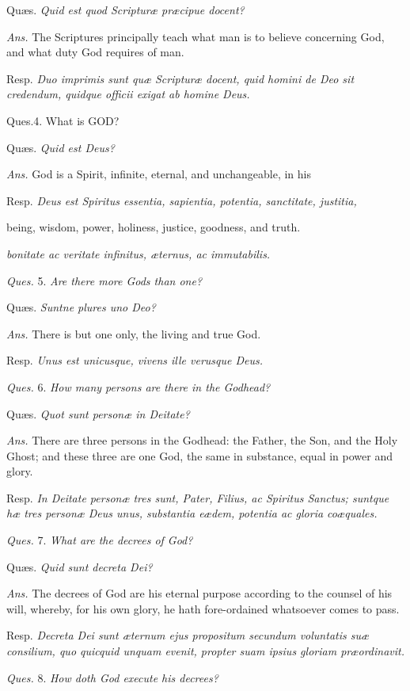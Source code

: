Quæs. \emph{Quid est quod Scripturæ præcipue docent?}

\emph{Ans.} The Scriptures principally teach what man is to believe concerning God, and what duty God requires of man.

Resp. \emph{Duo imprimis sunt quæ Scripturæ docent, quid homini de Deo sit credendum, quidque officii exigat ab homine Deus.}

Ques.4. What is GOD?

Quæs. \emph{Quid est Deus?}

\emph{Ans.} God is a Spirit, infinite, eternal, and unchangeable, in his

Resp. \emph{Deus est Spiritus essentia, sapientia, potentia, sanctitate, justitia,}

being, wisdom, power, holiness, justice, goodness, and truth.

\emph{bonitate ac veritate infinitus, æternus, ac immutabilis.}

\emph{Ques.} 5. \emph{Are there more Gods than one?}

Quæs. \emph{Suntne plures uno Deo?}

\emph{Ans.} There is but one only, the living and true God.

Resp. \emph{Unus est unicusque, vivens ille verusque Deus.}

\emph{Ques.} 6. \emph{How many persons are there in the Godhead?}

Quæs. \emph{Quot sunt personæ in Deitate?}

\emph{Ans.} There are three persons in the Godhead: the Father, the Son, and the Holy Ghost; and these three are one God, the same in substance, equal in power and glory.

Resp. \emph{In Deitate personæ tres sunt, Pater, Filius, ac Spiritus Sanctus; suntque hæ tres personæ Deus unus, substantia eædem, potentia ac gloria coæquales.}

\emph{Ques.} 7. \emph{What are the decrees of God?}

Quæs. \emph{Quid sunt decreta Dei?}

\emph{Ans.} The decrees of God are his eternal purpose according to the counsel of his will, whereby, for his own glory, he hath fore-ordained whatsoever comes to pass.

Resp. \emph{Decreta Dei sunt æternum ejus propositum secundum voluntatis suæ consilium, quo quicquid unquam evenit, propter suam ipsius gloriam præordinavit.}

\emph{Ques.} 8. \emph{How doth God execute his decrees?}

